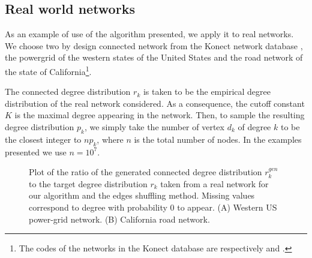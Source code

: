 \documentclass[
11pt, %
english, %
singlespacing, %
liststotoc, %
headsepline, %
]{MastersDoctoralThesis} %
\begin{document}
\subsection{Real world networks}

As an example of use of the algorithm presented, we apply it to real networks. We choose two by design connected network from the Konect network database \cite{kunegis2013konect}, the powergrid of the western states of the United States and the road network of the state of California\footnote{The codes of the networks in the Konect database are respectively  and .}.

The connected degree distribution $r_k$ is taken to be the empirical degree distribution of the real network considered. As a consequence, the cutoff constant $K$ is the maximal degree appearing in the network. Then, to sample the resulting degree distribution $p_k$, we simply take the number of vertex $d_k$ of degree $k$ to be the closest integer to $n p_k$, where $n$ is the total number of nodes. In the examples presented we use $n = 10^7$.

\begin{figure}
	\hfill
	\caption{Plot of the ratio of the generated connected degree distribution $r^{gen}_k$ to the target degree distribution $r_k$ taken from a real network for our algorithm and the edges shuffling method. Missing values correspond to degree with probability $0$ to appear. (A) Western US power-grid network. (B) California road network.}
	\label{Figure: Real examples}
\end{figure}
\end{document}
